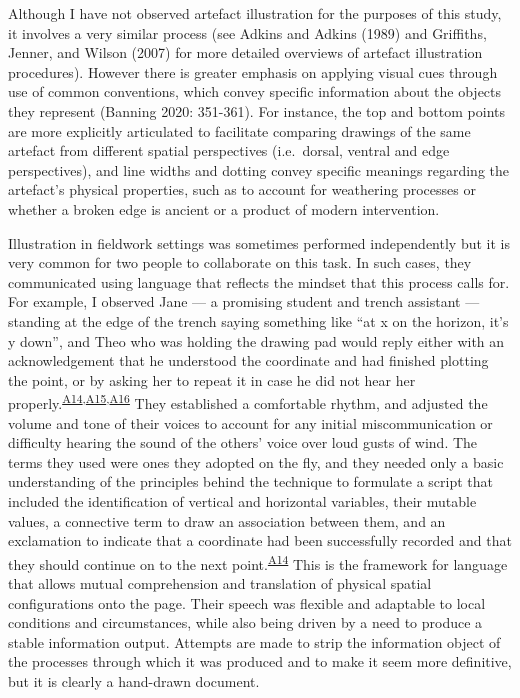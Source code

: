\documentclass[
]{article}
\providecommand{\DIFdelend}{} %
\DeclareRobustCommand{\DIFdelend}{\DIFOaddend \let\includegraphics\DIFOincludegraphics} %
\begin{document}
\DIFdelend Although I have not observed artefact illustration for the purposes of
this study, it involves a very similar process (see Adkins and Adkins
(1989) and Griffiths, Jenner, and Wilson (2007) for more detailed
overviews of artefact illustration procedures). However there is greater
emphasis on applying visual cues through use of common conventions,
which convey specific information about the objects they represent
(Banning 2020: 351-361). For instance, the top and bottom points are
more explicitly articulated to facilitate comparing drawings of the same
artefact from different spatial perspectives (i.e.~dorsal, ventral and
edge perspectives), and line widths and dotting convey specific meanings
regarding the artefact's physical properties, such as to account for
weathering processes or whether a broken edge is ancient or a product of
modern intervention.

Illustration in fieldwork settings was sometimes performed independently
but it is very common for two people to collaborate on this task. In
such cases, they communicated using language that reflects the mindset
that this process calls for. For example, I observed Jane --- a
promising student and trench assistant --- standing at the edge of the
trench saying something like ``at x on the horizon, it's y down'', and
Theo who was holding the drawing pad would reply either with an
acknowledgement that he understood the coordinate and had finished
plotting the point, or by asking her to repeat it in case he did not
hear her
properly.\textsuperscript{\hyperref[sec-A14]{A14},\hyperref[sec-15]{A15},\hyperref[sec-A16]{A16}}
They established a comfortable rhythm, and adjusted the volume and tone
of their voices to account for any initial miscommunication or
difficulty hearing the sound of the others' voice over loud gusts of
wind. The terms they used were ones they adopted on the fly, and they
needed only a basic understanding of the principles behind the technique
to formulate a script that included the identification of vertical and
horizontal variables, their mutable values, a connective term to draw an
association between them, and an exclamation to indicate that a
coordinate had been successfully recorded and that they should continue
on to the next point.\textsuperscript{\hyperref[sec-A14]{A14}} This is
the framework for language that allows mutual comprehension and
translation of physical spatial configurations onto the page. Their
speech was flexible and adaptable to local conditions and circumstances,
while also being driven by a need to produce a stable information
output. Attempts are made to strip the information object of the
processes through which it was produced and to make it seem more
definitive, but it is clearly a hand-drawn document.
\end{document}
